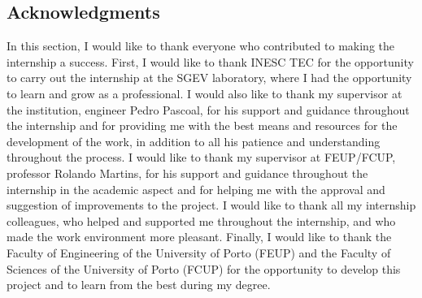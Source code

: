 \subsection{Acknowledgments}
In this section, I would like to thank everyone who contributed to making the internship a success. First, I would like to 
thank INESC TEC for the opportunity to carry out the internship at the SGEV laboratory, where I had the opportunity to learn and grow as 
a professional. I would also like to thank my supervisor at the institution, engineer Pedro Pascoal, for his support and guidance 
throughout the internship and for providing me with the best means and resources for the development of the work, in addition to all his patience 
and understanding throughout the process. I would like to thank my supervisor at FEUP/FCUP, professor Rolando Martins, for his support and 
guidance throughout the internship in the academic aspect and for helping me with the approval and suggestion of improvements to the project. I would like to 
thank all my internship colleagues, who helped and supported me throughout the internship, and who made the work environment more pleasant.
Finally, I would like to thank the Faculty of Engineering of the University of Porto (FEUP) and the Faculty of Sciences of the University of 
Porto (FCUP) for the opportunity to develop this project and to learn from the best during my degree.